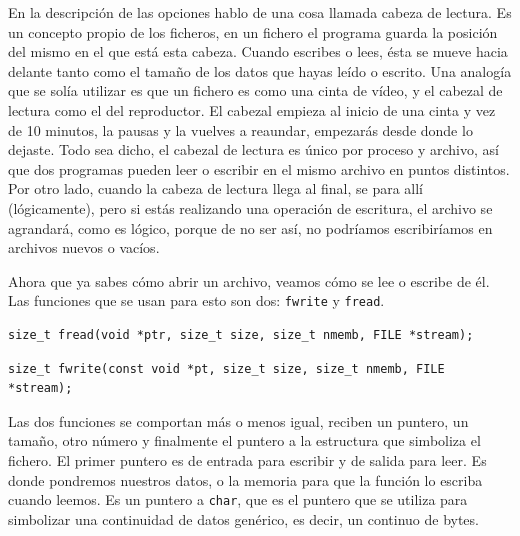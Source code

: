 \documentclass[a4paper]{article}
\begin{document}
En la descripción de las opciones hablo de una cosa llamada cabeza de lectura.
Es un concepto propio de los ficheros, en un fichero el programa guarda la
posición del mismo en el que está esta cabeza. Cuando escribes o lees, ésta
se mueve hacia delante tanto como el tamaño de los datos que hayas leído o escrito.
Una analogía que se solía utilizar es que un fichero es como una cinta de vídeo,
y el cabezal de lectura como el del reproductor. El cabezal empieza al inicio
de una cinta y vez de 10 minutos, la pausas y la vuelves a reaundar, empezarás
desde donde lo dejaste. Todo sea dicho, el cabezal de lectura es único por
proceso y archivo, así que dos programas pueden leer o escribir en el mismo
archivo en puntos distintos. Por otro lado, cuando la cabeza de lectura llega
al final, se para allí (lógicamente), pero si estás realizando una operación
de escritura, el archivo se agrandará, como es lógico, porque de no ser así,
no podríamos escribiríamos en archivos nuevos o vacíos.

Ahora que ya sabes cómo abrir un archivo, veamos cómo se lee o escribe de él.
Las funciones que se usan para esto son dos: \verb!fwrite! y \verb!fread!.

\noindent
\begin{minipage}[H]{\linewidth}
\mbox{}
\begin{lstlisting}[style=C,
caption={Declaración de la función \texttt{fread}},
label={lst:freadSignature}]
size_t fread(void *ptr, size_t size, size_t nmemb, FILE *stream);
\end{lstlisting}
\end{minipage}

\noindent
\begin{minipage}[H]{\linewidth}
\mbox{}
\begin{lstlisting}[style=C,
caption={Declaración de la función \texttt{fwrite}},
label={lst:fwriteSignature}]
size_t fwrite(const void *pt, size_t size, size_t nmemb, FILE *stream);
\end{lstlisting}
\end{minipage}

Las dos funciones se comportan más o menos igual, reciben un puntero, un tamaño,
otro número y finalmente el puntero a la estructura que simboliza el fichero.
El primer puntero es de entrada para escribir y de salida para leer. Es donde
pondremos nuestros datos, o la memoria para que la función lo escriba cuando
leemos. Es un puntero a \verb!char!, que es el puntero que se utiliza para
simbolizar una continuidad de datos genérico, es decir, un continuo de bytes.
\end{document}

